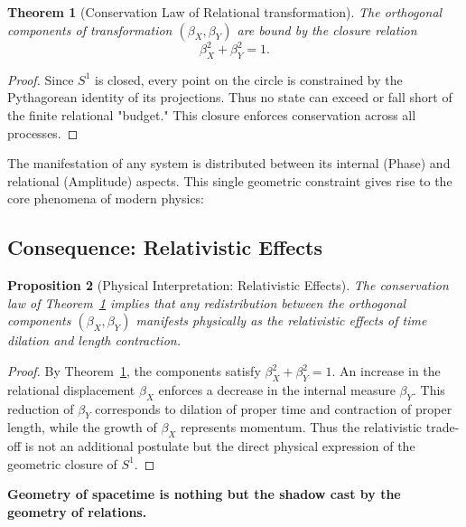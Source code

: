 \documentclass[12pt, a4paper]{article}
\newtheorem{theorem}{Theorem}[section]
\newtheorem{proposition}[theorem]{Proposition}
\begin{document}
\begin{theorem}[Conservation Law of Relational transformation]
\label{thm:conservation}
The orthogonal components of transformation $(\beta_X,\beta_Y)$ are bound by the closure relation
\[
\beta_X^2 + \beta_Y^2 = 1.
\]
\end{theorem}

\begin{proof}
Since $S^1$ is closed, every point on the circle is constrained by the Pythagorean identity of its projections. Thus no state can exceed or fall short of the finite relational "budget." This closure enforces conservation across all processes. 
\end{proof}

The manifestation of any system is distributed between its internal (Phase) and relational (Amplitude) aspects. This single geometric constraint gives rise to the core phenomena of modern physics:

\subsection{Consequence: Relativistic Effects}

\begin{proposition}[Physical Interpretation: Relativistic Effects]
\label{prop:relativity}
The conservation law of Theorem~\ref{thm:conservation} implies that any redistribution between 
the orthogonal components $(\beta_X,\beta_Y)$ manifests physically as the relativistic effects of 
time dilation and length contraction.
\end{proposition}

\begin{proof}
By Theorem~\ref{thm:conservation}, the components satisfy $\beta_X^2 + \beta_Y^2 = 1$. 
An increase in the relational displacement $\beta_X$ enforces a decrease in the internal measure $\beta_Y$. 
This reduction of $\beta_Y$ corresponds to dilation of proper time and contraction of proper length, 
while the growth of $\beta_X$ represents momentum. 
Thus the relativistic trade-off is not an additional postulate but the direct physical expression 
of the geometric closure of $S^1$.  
\end{proof}

\begin{tcolorbox}[colback=gray!5, colframe=black!80!black, title=Summary:]
\textbf{Geometry of spacetime is nothing but the shadow cast by the geometry of relations.}
\end{tcolorbox}
\end{document}
